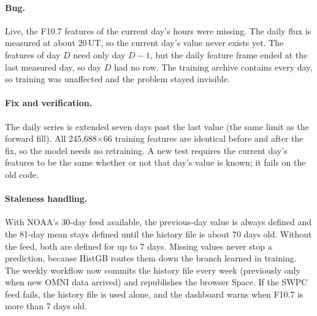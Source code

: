 \documentclass[11pt,a4paper]{article}
\begin{document}
\paragraph{Bug.} Live, the F10.7 features of the current day's hours were missing. The daily flux is measured at
about 20\,UT, so the current day's value never exists yet. The features of day $D$ need only day $D-1$, but the
daily feature frame ended at the last measured day, so day $D$ had no row. The training archive contains every
day, so training was unaffected and the problem stayed invisible.

\paragraph{Fix and verification.} The daily series is extended seven days past the last value (the same limit as
the forward fill). All 245{,}688$\times$66 training features are identical before and after the fix, so the
model needs no retraining. A new test requires the current day's features to be the same whether or not that day's
value is known; it fails on the old code.

\paragraph{Staleness handling.} With NOAA's 30-day feed available, the previous-day value is always defined and
the 81-day mean stays defined until the history file is about 70 days old. Without the feed, both are defined for
up to 7 days. Missing values never stop a prediction, because HistGB routes them down the branch learned in
training. The weekly workflow now commits the history file every week (previously only when new OMNI data
arrived) and republishes the browser Space. If the SWPC feed fails, the history file is used alone, and the
dashboard warns when F10.7 is more than 7 days old.

\end{document}
